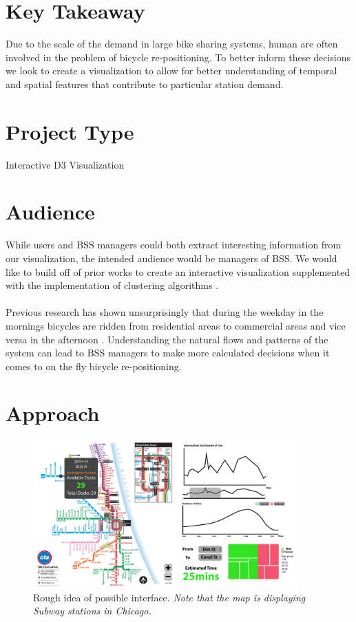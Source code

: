 \documentclass{proc}
\begin{document}
\section{Key Takeaway}

Due to the scale of the demand in large bike sharing systems, human are often involved in the problem of bicycle re-positioning. To better inform these decisions we look to create a visualization to allow for better understanding of temporal and spatial features that contribute to particular station demand.

\section{Project Type}

Interactive D3 Visualization

\section{Audience} 

While users and BSS managers could both extract interesting information from our visualization, the intended audience would be managers of BSS. We would like to build off of prior works to create an interactive visualization supplemented with the implementation of clustering algorithms \cite{bargar2014interactive}.
\\~\\
Previous research has shown unsurprisingly that during the weekday in the mornings bicycles are ridden from residential areas to commercial areas and vice versa in the afternoon \cite{bargar2014interactive}. Understanding the natural flows and patterns of the system can lead to BSS managers to make more calculated decisions when it comes to on the fly bicycle re-positioning.        
 
\section{Approach}

\begin{figure}[t]
  \centering
    \includegraphics[width=0.9\textwidth]{Sketch}
    \caption{Rough idea of possible interface. \textit{Note that the map is displaying Subway stations in Chicago.} }
  \label{fig:Sketch}
\end{figure}
\end{document}
